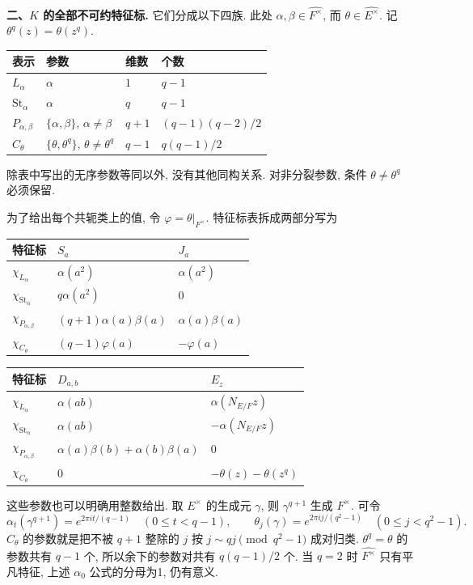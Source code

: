 \begin{solution}
\textbf{二、$K$ 的全部不可约特征标.}
它们分成以下四族. 此处 $\alpha,\beta\in\widehat{F^\times}$, 而 $\theta\in\widehat{E^\times}$. 记 $\theta^q(z)=\theta(z^q)$.
\begin{center}
\begin{tabular}{@{}llll@{}}
\toprule
表示 & 参数 & 维数 & 个数 \\
\midrule
$L_\alpha$ & $\alpha$ & $1$ & $q-1$ \\
$\mathrm{St}_\alpha$ & $\alpha$ & $q$ & $q-1$ \\
$P_{\alpha,\beta}$ & $\{\alpha,\beta\}$, $\alpha\ne\beta$ & $q+1$ & $(q-1)(q-2)/2$ \\
$C_\theta$ & $\{\theta,\theta^q\}$, $\theta\ne\theta^q$ & $q-1$ & $q(q-1)/2$ \\
\bottomrule
\end{tabular}
\end{center}
除表中写出的无序参数等同以外, 没有其他同构关系. 对非分裂参数, 条件 $\theta\ne\theta^q$ 必须保留.

为了给出每个共轭类上的值, 令 $\varphi=\theta|_{F^\times}$. 特征标表拆成两部分写为
\begin{center}
\begin{tabular}{@{}lll@{}}
\toprule
特征标 & $S_a$ & $J_a$ \\
\midrule
$\chi_{L_\alpha}$ & $\alpha(a^2)$ & $\alpha(a^2)$ \\
$\chi_{\mathrm{St}_\alpha}$ & $q\alpha(a^2)$ & $0$ \\
$\chi_{P_{\alpha,\beta}}$ & $(q+1)\alpha(a)\beta(a)$ & $\alpha(a)\beta(a)$ \\
$\chi_{C_\theta}$ & $(q-1)\varphi(a)$ & $-\varphi(a)$ \\
\bottomrule
\end{tabular}
\end{center}
\begin{center}
\begin{tabular}{@{}lll@{}}
\toprule
特征标 & $D_{a,b}$ & $E_z$ \\
\midrule
$\chi_{L_\alpha}$ & $\alpha(ab)$ & $\alpha(N_{E/F}z)$ \\
$\chi_{\mathrm{St}_\alpha}$ & $\alpha(ab)$ & $-\alpha(N_{E/F}z)$ \\
$\chi_{P_{\alpha,\beta}}$ & $\alpha(a)\beta(b)+\alpha(b)\beta(a)$ & $0$ \\
$\chi_{C_\theta}$ & $0$ & $-\theta(z)-\theta(z^q)$ \\
\bottomrule
\end{tabular}
\end{center}
这些参数也可以明确用整数给出. 取 $E^\times$ 的生成元 $\gamma$, 则 $\gamma^{q+1}$ 生成 $F^\times$. 可令
\[
 \alpha_t(\gamma^{q+1})=e^{2\pi it/(q-1)}\quad(0\le t<q-1),\qquad
 \theta_j(\gamma)=e^{2\pi ij/(q^2-1)}\quad(0\le j<q^2-1).
\]
$C_\theta$ 的参数就是把不被 $q+1$ 整除的 $j$ 按 $j\sim qj\pmod{q^2-1}$ 成对归类. $\theta^q=\theta$ 的参数共有 $q-1$ 个, 所以余下的参数对共有 $q(q-1)/2$ 个. 当 $q=2$ 时 $\widehat{F^\times}$ 只有平凡特征, 上述 $\alpha_0$ 公式的分母为1, 仍有意义.


\end{solution}
